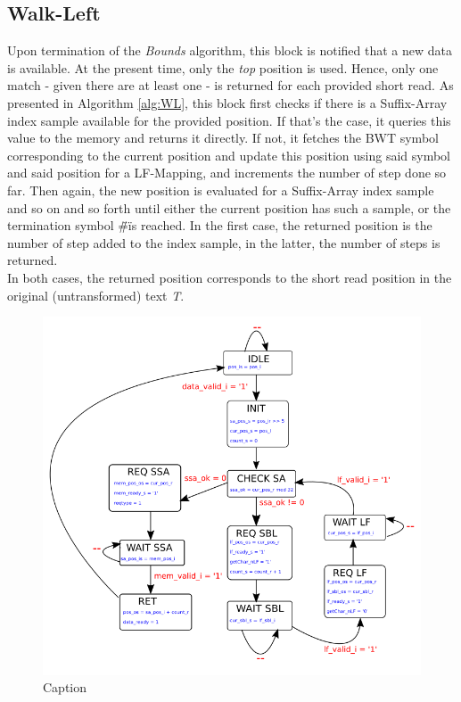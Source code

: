 \subsection{Walk-Left}


Upon termination of the \textsl{Bounds} algorithm, this block is notified that a new data is available. At the present time, only the \textsl{top} position is used. Hence, only one match - given there are at least one - is returned for each provided short read. As presented in Algorithm \ref{alg:WL}, this block first checks if there is a Suffix-Array index sample available for the provided position. If that's the case, it queries this value to the memory and returns it directly. If not, it fetches the BWT symbol corresponding to the current position and update this position using said symbol and said position for a LF-Mapping, and increments the number of step done so far. Then again, the new position is evaluated for a Suffix-Array index sample and so on and so forth until either the current position has such a sample, or the termination symbol \"\#\" is reached.
In the first case, the returned position is the number of step added to the index sample, in the latter, the number of steps is returned. \\

In both cases, the returned position corresponds to the short read position in the original (untransformed) text \textsl{T}.


\begin{minipage}[t]{0.45\textwidth}
\begin{figure}[H]
    \centering
    \hspace*{-20mm}\includegraphics[scale = 0.45]{Figures/WL_FSM.png}
    \caption{Caption}
    \label{fig:wl_fsm}
\end{figure}
\end{minipage}
\hfill
\begin{minipage}[t]{0.3\textwidth}

\end{minipage}
\vspace*{8mm}


